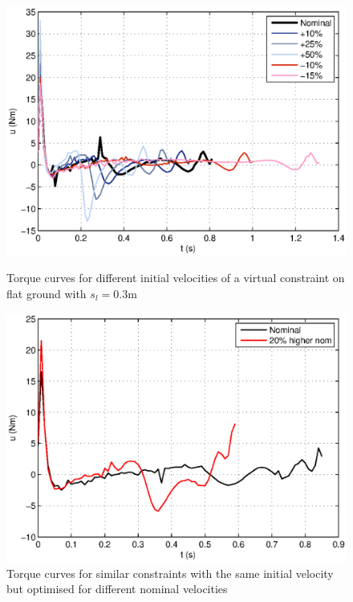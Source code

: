 \begin{figure}
	\begin{minipage}{0.48\textwidth}
		\centering
		\includegraphics[width=\linewidth]{7Results/singleflattorque}
		\caption[Torque curves for differing initial velocities on flat ground]{Torque curves for different initial velocities of a virtual constraint on flat ground with $s_l=0.3$m}
		\label{fig:singleflattorque}
	\end{minipage}
	\hfill
	\begin{minipage}{0.48\textwidth}
		\centering
		\includegraphics[width=\linewidth]{7Results/twonomvels}
		\caption[Torque curves with differing nominal velocities]{Torque curves for similar constraints with the same initial velocity but optimised for different nominal velocities}
		\label{fig:twonomvels}
	\end{minipage}
\end{figure}

